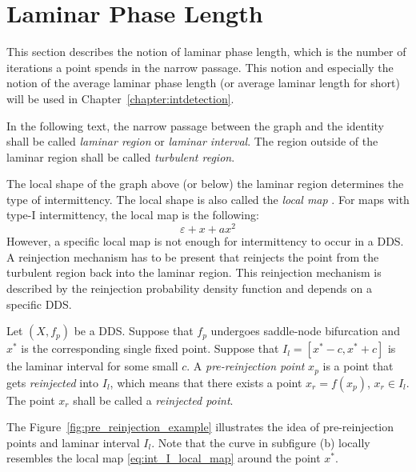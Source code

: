 \section{Laminar Phase Length}

This section describes the notion of laminar phase length, which is the number of iterations a point spends in the narrow passage.
This notion and especially the notion of the average laminar phase length (or average laminar length for short) will be used in Chapter~\ref{chapter:intdetection}.
\par
In the following text, the narrow passage between the graph and the identity shall be called \emph{laminar region} or \emph{laminar interval}.
The region outside of the laminar region shall be called \emph{turbulent region}.
\par
The local shape of the graph above (or below) the laminar region determines the type of intermittency.
The local shape is also called the \emph{local map} \cite{Elaskar2017}.
For maps with type-I intermittency, the local map is the following:
\begin{equation}
\varepsilon + x + a x^2 \label{eq:int_I_local_map}
\end{equation}
However, a specific local map is not enough for intermittency to occur in a DDS.
A reinjection mechanism has to be present that reinjects the point from the turbulent region back into the laminar region.
This reinjection mechanism is described by the reinjection probability density function and depends on a specific DDS. \cite{Elaskar2017}
\par
Let $(X, f_{p})$ be a DDS. Suppose that $f_{p}$ undergoes saddle-node bifurcation and $x^{*}$ is the corresponding single fixed point.
Suppose that $I_l = [ x^{*}-c, x^{*}+c ]$ is the laminar interval for some small $c$.
A \emph{pre-reinjection point} $x_p$ is a point that gets \emph{reinjected} into $I_l$, which means that there exists a point $x_r = f(x_p)$, $x_r \in I_l$.
The point $x_r$ shall be called a \emph{reinjected point}.
\par
The Figure~\ref{fig:pre_reinjection_example} illustrates the idea of pre-reinjection points and laminar interval $I_l$.
Note that the curve in subfigure (b) locally resembles the local map \eqref{eq:int_I_local_map} around the point $x^{*}$.
